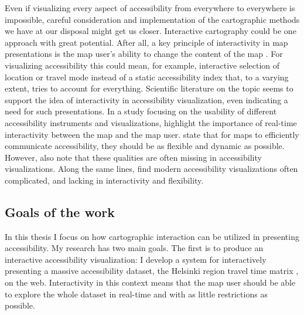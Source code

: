 Even if visualizing every aspect of accessibility
from everywhere to everywhere is impossible,
careful consideration and implementation
of the cartographic methods we have at our disposal might get us closer.
Interactive cartography could be one approach with great potential.
After all, a key principle of interactivity in map presentations is
the map user's ability to change the content of the map \parencite{rot2013b}.
For visualizing accessibility this could mean, for example,
interactive selection of location or travel mode instead of
a static accessibility index that, to a varying extent,
tries to account for everything.
Scientific literature on the topic seems to support the idea of
interactivity in accessibility visualization,
even indicating a need for such presentations.
In a study focusing on the usability of
different accessibility instruments and visualizations,  %
\textcite{te2014} highlight the importance of
real-time interactivity between the map and the map user.
\textcite{but2018} state that for maps to efficiently communicate accessibility,
they should be as flexible and dynamic as possible.
However, \textcite{but2018} also note that
these qualities are often missing in accessibility visualizations.
Along the same lines, \textcite{paj2021} find modern accessibility visualizations often complicated,
and lacking in interactivity and flexibility.


\subsection{Goals of the work}

In this thesis I focus on
how cartographic interaction can be utilized in presenting accessibility.
My research has two main goals.
The first is to produce an interactive accessibility visualization: %
I develop a system for interactively presenting a massive accessibility dataset,
the Helsinki region travel time matrix \parencite{fin2023},
on the web.  %
Interactivity in this context means that
the map user should be able to
explore the whole dataset in real-time
and with as little restrictions as possible.

